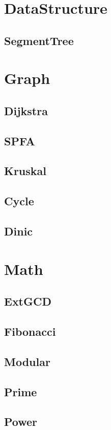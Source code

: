 \section{DataStructure}
\subsection{SegmentTree}



\section{Graph}
\subsection{Dijkstra}

\subsection{SPFA}

\subsection{Kruskal}

\subsection{Cycle}

\subsection{Dinic}



\section{Math}
\subsection{ExtGCD}

\subsection{Fibonacci}

\subsection{Modular}

\subsection{Prime}

\subsection{Power}
